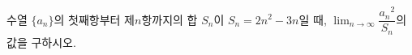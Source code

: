 수열 $\{a_n\}$의 첫째항부터 제$n$항까지의 합 $S_n$이 $S_n=2n^2-3n$일 때, $\displaystyle\lim_{n\to\infty}\dfrac{{a_n}^2}{S_n}$의 값을 구하시오.
